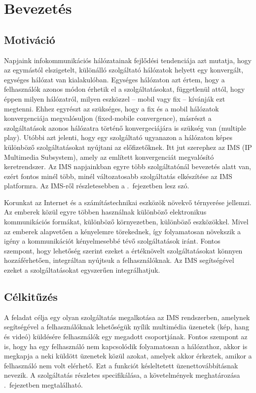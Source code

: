 
\section{Bevezetés}

\subsection{Motiváció}

Napjaink infokommunikációs hálózatainak fejlődési tendenciája azt mutatja, hogy az egymástól elszigetelt,
különálló szolgáltató hálózatok helyett egy konvergált, egységes hálózat van kialakulóban. Egységes hálózaton azt értem, hogy a felhasználók azonos módon érhetik el a szolgáltatásokat, függetlenül attól, hogy éppen milyen hálózatról, milyen eszközzel -- mobil vagy fix -- kívánják ezt megtenni. Ehhez egyrészt az szükséges, hogy a fix és a mobil hálózatok konvergenciája megvalósuljon (fixed-mobile convergence), másrészt a szolgáltatások azonos hálózatra történő konvergeciájára is szükség van (multiple play). Utóbbi azt jelenti, hogy egy szolgáltató ugyanazon a hálózaton képes különböző szolgáltatásokat nyújtani az előfizetőknek. Itt jut szerephez az IMS (IP Multimedia Subsystem), amely az említett konvergenciát megvalósító keretrendszer. Az IMS napjainkban egyre több szolgáltatónál bevezetés alatt van, ezért fontos minél több, minél változatosabb szolgáltatás elkészítése az IMS platformra.  Az IMS-ről részletesebben a .~fejezetben lesz szó.

Korunkat az Internet és a számítástechnikai eszközök növekvő térnyerése jellemzi. Az emberek közül egyre többen használnak különböző elektronikus kommunikációs formákat, különböző környezetben, különböző eszközökkel. Mivel az emberek alapvetően a kényelemre törekednek, így folyamatosan növekszik a igény a  kommunikációt kényelmesebbé tévő szolgáltatások iránt. Fontos szempont, hogy lehetőség szerint ezeket a értéknövelt szolgáltatásokat könnyen hozzáférhetően, integráltan nyújtsuk a felhasználóknak. Az IMS segítségével ezeket a szolgáltatásokat egyszerűen integrálhatjuk.

\subsection{Célkitűzés}

A feladat célja egy olyan szolgáltatás megalkotása az IMS rendszerben, amelynek
segítségével a felhasználóknak lehetőségük nyílik multimédia üzenetek (kép, hang és videó) küldésére felhasználók egy megadott csoportjának. Fontos szempont az is, hogy ha egy felhasználó nem kapcsolódik folyamatosan a hálózathoz, akkor is megkapja a neki küldött üzenetek közül azokat, amelyek akkor érkeztek, amikor a felhasználó nem volt elérhető. Ezt a funkciót késleltetett üzenettovábbításnak nevezik. A szolgáltatás részletes specifikálása, a követelmények meghatározása .~fejezetben megtalálható.

